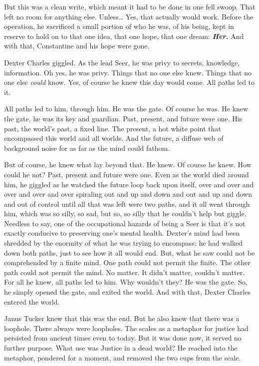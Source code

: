 But this was a clean write, which meant it had to be done in one fell swoop. That left no room for anything else. Unless… Yes, that actually would work. Before the operation, he sacrificed a small portion of who he was, of his being, kept in reserve to hold on to that one idea, that one hope, that one dream:
\SmallVSpace
\textbf{\emph{Her.}}
\SomeVSpace
And with that, Constantine and his hope were gone.
\simpleline
{}

Dexter Charles giggled. As the lead Seer, he was privy to secrets, knowledge, information. Oh yes, he was privy. Things that no one else knew. Things that no one else \emph{could} know. Yes, of course he knew this day would come. All paths led to it.

All paths led to him, through him. He was the gate. Of course he was. He knew the gate, he was its key and guardian. Past, present, and future were one. His past, the world’s past, a fixed line. The present, a hot white point that encompassed this world and all worlds. And the future, a diffuse web of background noise for as far as the mind could fathom.

But of course, he knew what lay beyond that. He knew. Of course he knew. How could he not? Past, present and future were one. Even as the world died around him, he giggled as he watched the future loop back upon itself, over and over and over and over and over spiraling out and up and down and out and up and down and out of control until all that was left were two paths, and it all went through him, which was so silly, so sad, but so, so silly that he couldn’t help but giggle.
\SmallVSpace
Needless to say, one of the occupational hazards of being a Seer is that it’s not exactly conducive to preserving one’s mental health. Dexter’s mind had been shredded by the enormity of what he was trying to encompass: he had walked down both paths, just to see how it all would end. But, what he saw could not be comprehended by a finite mind.
\SmallVSpace
One path could not permit the finite.
\SmallVSpace
The other path could not permit the mind.
\SmallVSpace
No matter. It didn’t matter, couldn’t matter. For all he knew, all paths led to him. Why wouldn’t they? He was the gate. So, he simply opened the gate, and exited the world.
\SomeVSpace
And with that, Dexter Charles entered the world.
\simpleline
{}

Janus Tucker knew that this was the end. But he also knew that there was a loophole. There always were loopholes. The scales as a metaphor for justice had persisted from ancient times even to today. But it was done now, it served no further purpose. What use was Justice in a dead world? He reached into the metaphor, pondered for a moment, and removed the two cups from the scale.

